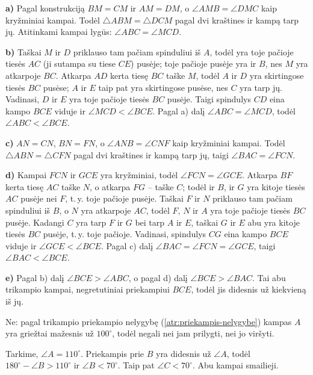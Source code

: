 \documentclass[12pt,a4paper,reqno]{amsart}
\theoremstyle{plain}\newtheorem{theorem}{Teorema}[section]
\theoremstyle{definition}
\theoremstyle{remark}\newtheorem{remark}[theorem]{Pastaba}\newtheorem*{remark*}{Pastaba}
\theoremstyle{definition}\newtheorem*{problem*}{Uždavinys}
\begin{document}
\begin{solution}[\ref{atr:priekampis-nelygybe}]
\textbf{a)} Pagal konstrukciją $BM=CM$ ir $AM=DM$, o $\angle AMB=\angle DMC$ kaip kryžminiai kampai. Todėl $\triangle ABM=\triangle DCM$ pagal dvi kraštines ir kampą tarp jų. Atitinkami kampai lygūs: $\angle ABC=\angle MCD$.

\textbf{b)} Taškai $M$ ir $D$ priklauso tam pačiam spinduliui iš $A$, todėl yra toje pačioje tiesės $AC$ (ji sutampa su tiese $CE$) pusėje; toje pačioje pusėje yra ir $B$, nes $M$ yra atkarpoje $BC$. Atkarpa $AD$ kerta tiesę $BC$ taške $M$, todėl $A$ ir $D$ yra skirtingose tiesės $BC$ pusėse; $A$ ir $E$ taip pat yra skirtingose pusėse, nes $C$ yra tarp jų. Vadinasi, $D$ ir $E$ yra toje pačioje tiesės $BC$ pusėje. Taigi spindulys $CD$ eina kampo $BCE$ viduje ir $\angle MCD<\angle BCE$. Pagal a) dalį $\angle ABC=\angle MCD$, todėl $\angle ABC<\angle BCE$.

\textbf{c)} $AN=CN$, $BN=FN$, o $\angle ANB=\angle CNF$ kaip kryžminiai kampai. Todėl $\triangle ABN=\triangle CFN$ pagal dvi kraštines ir kampą tarp jų, taigi $\angle BAC=\angle FCN$.

\textbf{d)} Kampai $FCN$ ir $GCE$ yra kryžminiai, todėl $\angle FCN=\angle GCE$. Atkarpa $BF$ kerta tiesę $AC$ taške $N$, o atkarpa $FG$ – taške $C$; todėl ir $B$, ir $G$ yra kitoje tiesės $AC$ pusėje nei $F$, t.\,y. toje pačioje pusėje. Taškai $F$ ir $N$ priklauso tam pačiam spinduliui iš $B$, o $N$ yra atkarpoje $AC$, todėl $F$, $N$ ir $A$ yra toje pačioje tiesės $BC$ pusėje. Kadangi $C$ yra tarp $F$ ir $G$ bei tarp $A$ ir $E$, taškai $G$ ir $E$ abu yra kitoje tiesės $BC$ pusėje, t.\,y. toje pačioje. Vadinasi, spindulys $CG$ eina kampo $BCE$ viduje ir $\angle GCE<\angle BCE$. Pagal c) dalį $\angle BAC=\angle FCN=\angle GCE$, taigi $\angle BAC<\angle BCE$.

\textbf{e)} Pagal b) dalį $\angle BCE>\angle ABC$, o pagal d) dalį $\angle BCE>\angle BAC$. Tai abu trikampio kampai, negretutiniai priekampiui $BCE$, todėl jis didesnis už kiekvieną iš jų.
\end{solution}
\begin{solution}[\ref{uzd:priekampis-pratimai}] Ne: pagal trikampio priekampio nelygybę (\ref{atr:priekampis-nelygybe}) kampas $A$ yra griežtai mažesnis už $100^\circ$, todėl negali nei jam prilygti, nei jo viršyti. \end{solution}
\begin{solution}[\ref{uzd:priekampis-taikymas}] Tarkime, $\angle A=110^\circ$. Priekampis prie $B$ yra didesnis už $\angle A$, todėl $180^\circ-\angle B>110^\circ$ ir $\angle B<70^\circ$. Taip pat $\angle C<70^\circ$. Abu kampai smailieji. \end{solution}
\end{document}
